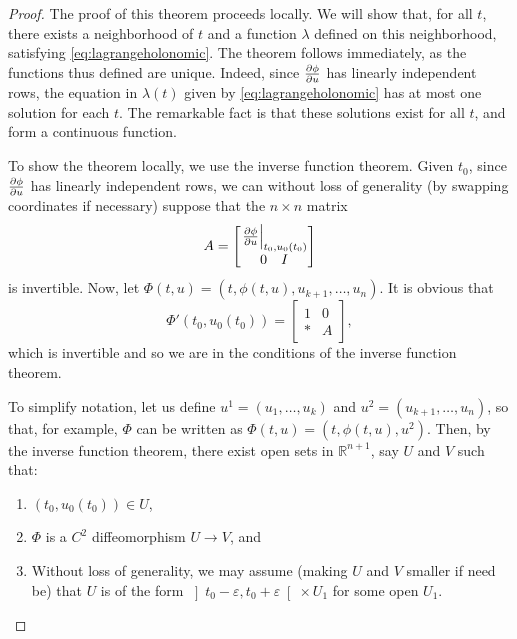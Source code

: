 \documentclass{article}
\theoremstyle{plain}
\theoremstyle{plain}
\theoremstyle{nonumberplain}
\newtheorem{proof}{Proof}
\theoremstyle{empty}
\newcommand{\R}{\mathbb{R}}
\DeclarePairedDelimiter\eval{.}{\rvert}
\begin{document}
\begin{proof}
The proof of this theorem proceeds locally. We will show that, for all $t$, there exists a neighborhood of $t$ and a function $\lambda$ defined on this neighborhood, satisfying \eqref{eq:lagrangeholonomic}. The theorem follows immediately, as the functions thus defined are unique. Indeed, since $\diffp \phi u$ has linearly independent rows, the equation in $\lambda(t)$ given by \eqref{eq:lagrangeholonomic} has at most one solution for each $t$. The remarkable fact is that these solutions exist for all $t$, and form a continuous function.

To show the theorem locally, we use the inverse function theorem. Given $t_0$, since $\diffp\phi u$ has linearly independent rows, we can without loss of generality (by swapping coordinates if necessary) suppose that the $n \times n$ matrix
\[
A = \begin{bmatrix}
\eval*{\diffp\phi u}_{t_0,u_0(t_0)}\\
\begin{matrix}
0 & I
\end{matrix}
\end{bmatrix}
\]
is invertible. Now, let $\Phi(t,u) = (t, \phi(t,u), u_{k+1}, \dots, u_n)$. It is obvious that
\[\Phi'(t_0, u_0(t_0)) =
\begin{bmatrix}
1 & 0\\
* & A
\end{bmatrix},\]
which is invertible and so we are in the conditions of the inverse function theorem.

To simplify notation, let us define $u^1 = (u_1, \dots, u_k)$ and $u^2 = (u_{k+1}, \dots, u_n)$, so that, for example, $\Phi$ can be written as $\Phi(t,u) = (t, \phi(t,u), u^2)$. Then, by the inverse function theorem, there exist open sets in $\R^{n+1}$, say $U$ and $V$ such that:
\begin{enumerate}
\item $(t_0, u_0(t_0)) \in U$,
\item $\Phi$ is a $C^2$ diffeomorphism $U \to V$, and
\item Without loss of generality, we may assume (making $U$ and $V$ smaller if need be) that $U$ is of the form $\left]t_0-\varepsilon, t_0+\varepsilon\right[ \times U_1$ for some open $U_1$.
\end{enumerate}


\end{proof}
\end{document}
